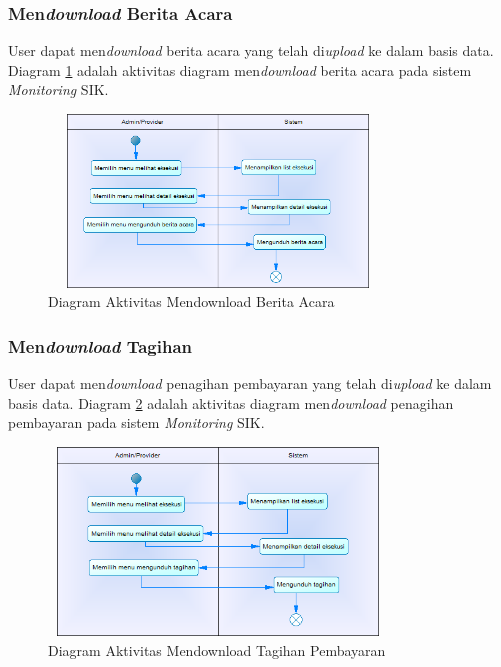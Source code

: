 	\subsubsection{Men\textit{download} Berita Acara}
	User dapat men\textit{download} berita acara yang telah di\textit{upload} ke dalam basis data. Diagram \ref{figure:activity_mendownload_berita_acara} adalah aktivitas diagram men\textit{download} berita acara pada sistem \textit{Monitoring} SIK.
	\begin{figure}[h]
	\centerline
	{\includegraphics[width=9cm,height=4.6cm]{bab4/ActivityDiagram_DownloadBeritaAcara.png}}
	\caption{Diagram Aktivitas Mendownload Berita Acara}
	\label{figure:activity_mendownload_berita_acara}
	\end{figure}
	
	\subsubsection{Men\textit{download} Tagihan}
	User dapat men\textit{download} penagihan pembayaran yang telah di\textit{upload} ke dalam basis data. Diagram \ref{figure:activity_mendownload_tagihan} adalah aktivitas diagram men\textit{download} penagihan pembayaran pada sistem \textit{Monitoring} SIK.
	\begin{figure}[h]
	\centerline
	{\includegraphics[width=9cm,height=5cm]{bab4/ActivityDiagram_DownloadTagihan.png}}
	\caption{Diagram Aktivitas Mendownload Tagihan Pembayaran}
	\label{figure:activity_mendownload_tagihan}
	\end{figure}

